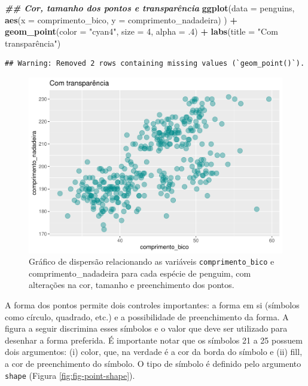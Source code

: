 \documentclass[
]{article}
\newenvironment{Shaded}{\begin{snugshade}}{\end{snugshade}}
\newcommand{\AttributeTok}[1]{\textcolor[rgb]{0.13,0.29,0.53}{#1}}
\newcommand{\DecValTok}[1]{\textcolor[rgb]{0.00,0.00,0.81}{#1}}
\newcommand{\DocumentationTok}[1]{\textcolor[rgb]{0.56,0.35,0.01}{\textbf{\textit{#1}}}}
\newcommand{\FunctionTok}[1]{\textcolor[rgb]{0.13,0.29,0.53}{\textbf{#1}}}
\newcommand{\NormalTok}[1]{#1}
\newcommand{\SpecialCharTok}[1]{\textcolor[rgb]{0.81,0.36,0.00}{\textbf{#1}}}
\newcommand{\StringTok}[1]{\textcolor[rgb]{0.31,0.60,0.02}{#1}}
\begin{document}
\begin{Shaded}
\begin{Highlighting}[]
\DocumentationTok{\#\# Cor, tamanho dos pontos e transparência}
\FunctionTok{ggplot}\NormalTok{(}\AttributeTok{data =}\NormalTok{ penguins, }
       \FunctionTok{aes}\NormalTok{(}\AttributeTok{x =}\NormalTok{ comprimento\_bico, }\AttributeTok{y =}\NormalTok{ comprimento\_nadadeira)}
\NormalTok{       ) }\SpecialCharTok{+}
    \FunctionTok{geom\_point}\NormalTok{(}\AttributeTok{color =} \StringTok{"cyan4"}\NormalTok{, }\AttributeTok{size =} \DecValTok{4}\NormalTok{, }\AttributeTok{alpha =}\NormalTok{ .}\DecValTok{4}\NormalTok{) }\SpecialCharTok{+}
    \FunctionTok{labs}\NormalTok{(}\AttributeTok{title =} \StringTok{"Com transparência"}\NormalTok{)}
\end{Highlighting}
\end{Shaded}

\begin{verbatim}
## Warning: Removed 2 rows containing missing values (`geom_point()`).
\end{verbatim}

\begin{figure}
\centering
\includegraphics{epr_files/figure-latex/fig-scatter-col-2.pdf}
\caption{\label{fig:fig-scatter-col-2}Gráfico de dispersão relacionando as variáveis \texttt{comprimento\_bico} e comprimento\_nadadeira para cada espécie de penguim, com alterações na cor, tamanho e preenchimento dos pontos.}
\end{figure}

A forma dos pontos permite dois controles importantes: a forma em si (símbolos como círculo, quadrado, etc.) e a possibilidade de preenchimento da forma. A figura a seguir discrimina esses símbolos e o valor que deve ser utilizado para desenhar a forma preferida. É importante notar que os símbolos 21 a 25 possuem dois argumentos: (i) color, que, na verdade é a cor da borda do símbolo e (ii) fill, a cor de preenchimento do símbolo. O tipo de símbolo é definido pelo argumento \texttt{shape} (Figura \ref{fig:fig-point-shape}).
\end{document}

